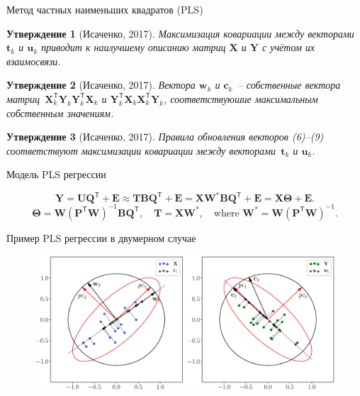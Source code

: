 \documentclass[9pt]{beamer}
\newcommand{\bw}{\mathbf{w}}
\newcommand{\bY}{\mathbf{Y}}
\newcommand{\bX}{\mathbf{X}}
\newcommand{\bu}{\mathbf{u}}
\newcommand{\bt}{\mathbf{t}}
\newcommand{\bc}{\mathbf{c}}
\newcommand{\bP}{\mathbf{P}}
\newcommand{\bT}{\mathbf{T}}
\newcommand{\bB}{\mathbf{B}}
\newcommand{\bQ}{\mathbf{Q}}
\newcommand{\bE}{\mathbf{E}}
\newcommand{\bU}{\mathbf{U}}
\newcommand{\bW}{\mathbf{W}}
\newcommand{\bTheta}{\boldsymbol{\Theta}}
\newcommand{\T}{\mathsf{T}}
\newtheorem{statement}{Утверждение}
\begin{document}
\begin{frame}{Метод частных наименьших квадратов (PLS)}

\begin{statement}[Исаченко, 2017]
Максимизация ковариации между векторами~$\bt_k$ и $\bu_k$ приводит к наилучшему описанию матриц $\bX$ и $\bY$ с учётом их взаимосвязи.
\end{statement}
\begin{statement}[Исаченко, 2017]
Вектора $\bw_k$ и $\bc_k$~-- собственные вектора матриц~$\bX_k^{\T} \bY_k \bY_k^{\T} \bX_k$ и $\bY_k^{\T} \bX_k \bX_k^{\T} \bY_k$, соответствуюшие максимальным собственным значениям.
\end{statement}
\begin{statement}[Исаченко, 2017]
Правила обновления векторов (6)--(9) соответствуют максимизации ковариации между векторами~$\bt_k$ и $\bu_k$.
\end{statement}

\begin{block}{Модель PLS регрессии}

\[
\bY = \bU \bQ^{\T} + \bE \approx \bT \bB \bQ^{\T}+ \bE = \bX \bW^* \bB \bQ^{\T} + \bE = \bX \bTheta + \bE.
\]
\vspace{0.1cm}
\[
\bTheta = \bW (\bP^{\T} \bW)^{-1} \bB \bQ^{\T}, \quad \bT = \bX \bW^*, \quad \text{where } \bW^* = \bW (\bP^{\T} \bW)^{-1}.
\]
\end{block}
\end{frame}
\begin{frame}{Пример PLS регрессии в двумерном случае}
\begin{figure}[h]
\centering
\includegraphics[width=\linewidth]{figs/PLSFigure.eps}
\end{figure}
\end{frame}
\end{document}

